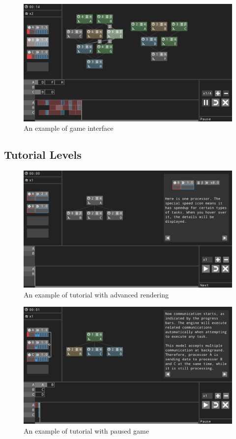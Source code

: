 \documentclass[msc,deptreport, cs]{infthesis}
\begin{document}
\begin{figure}[!htb]
  \centering
  \includegraphics[width=\columnwidth]{play1.png}
  \caption{An example of game interface}
  \label{fig:container}
\end{figure}



\subsection{Tutorial Levels}

\begin{figure}[!htb]
  \centering
  \includegraphics[width=\columnwidth]{play4.png}
  \caption{An example of tutorial with advanced rendering}
  \label{fig:container}
\end{figure}


\begin{figure}[!htb]
  \centering
  \includegraphics[width=\columnwidth]{play5.png}
  \caption{An example of tutorial with paused game}
  \label{fig:container}
\end{figure}
\end{document}
